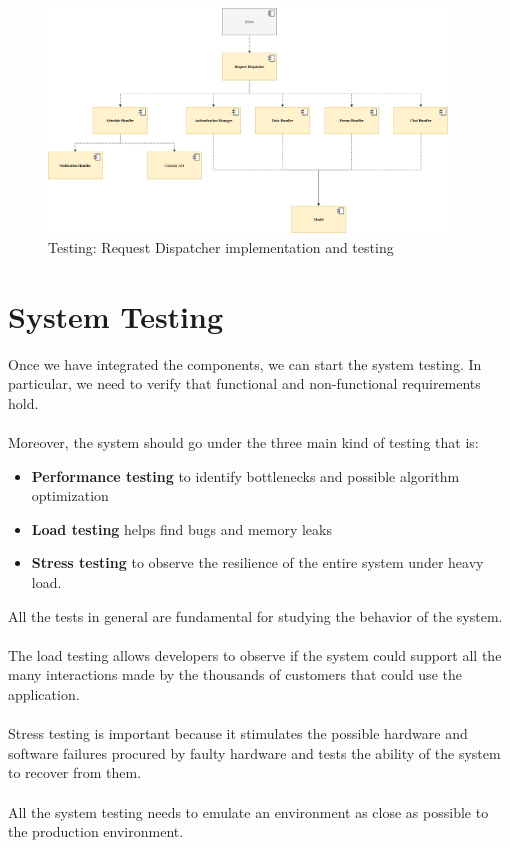 \documentclass[10pt]{report}
\begin{document}
\begin{figure}[H]
    \centering
    \includegraphics[width=400px]{Testing/T_09.jpg}
    \caption{Testing: Request Dispatcher implementation and testing}
\end{figure}

\section{System Testing}
Once we have integrated the components, we can start the system testing. In particular,
we need to verify that functional and non-functional requirements hold.\\ \\Moreover, the system
should go under the three main kind of testing that is:
\begin{itemize}
    \item  \textbf{Performance testing} to identify bottlenecks and possible algorithm
optimization
    \item \textbf{Load testing} helps find bugs and memory leaks
    \item  \textbf{Stress testing} to observe the resilience of the entire system under heavy
load.
\end{itemize}
All the tests in general are fundamental for studying the behavior of the
system. \\ \\ The load testing
allows developers to observe if the system could support all the many interactions made by the thousands of customers that could use the application.\\ \\
Stress testing is important because it stimulates the possible hardware and software failures procured by faulty hardware and tests the ability of the system to recover from them.\\ \\
All the system testing needs to emulate an environment as close as possible to the production environment.
\end{document}
